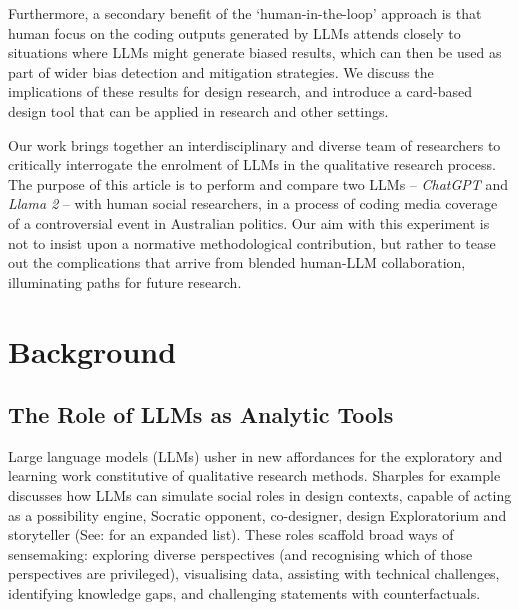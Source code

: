 \documentclass{article}
\begin{document}
Furthermore, a secondary benefit of the `human-in-the-loop' approach is that  human focus on the coding outputs generated by LLMs attends closely to situations where LLMs might generate biased results, which can then be used as part of wider bias detection and mitigation strategies. We discuss the implications of these results for design research, and introduce a card-based design tool that can be applied in research and other settings. 

Our work brings together an interdisciplinary and diverse team of researchers to critically interrogate the enrolment of LLMs in the qualitative research process. The purpose of this article is to perform and compare two LLMs – \emph{ChatGPT} and \emph{Llama 2} – with human social researchers, in a process of coding media coverage of a controversial event in Australian politics. Our aim with this experiment is not to insist upon a normative methodological contribution, but rather to tease out the complications that arrive from blended human-LLM collaboration, illuminating paths for future research.

\section{Background}\label{background}

\subsection*{The Role of LLMs as Analytic Tools}\label{the-role-of-llms-as-analytic-tools}

Large language models (LLMs) usher in new affordances for the exploratory and learning work constitutive of qualitative research methods. Sharples \cite{sharplesSocialGenerativeAI2023} for example discusses how LLMs can simulate social roles in design contexts, capable of acting as a possibility engine, Socratic opponent, co-designer, design Exploratorium and storyteller (See: \cite{sabzalievaChatGPTArtificialIntelligence2023} for an expanded list). These roles scaffold broad ways of sensemaking: exploring diverse  perspectives (and recognising which of those perspectives are privileged), visualising data, assisting with technical challenges, identifying knowledge gaps, and challenging statements with counterfactuals.
\end{document}
